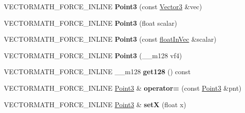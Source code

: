 \begin{DoxyCompactItemize}
\item 
\mbox{\label{classVectormath_1_1Aos_1_1Point3_a7ede6b811d45cdbe2cc50a5c2c4d5615}} 
V\+E\+C\+T\+O\+R\+M\+A\+T\+H\+\_\+\+F\+O\+R\+C\+E\+\_\+\+I\+N\+L\+I\+NE {\bfseries Point3} (const \hyperlink{classVectormath_1_1Aos_1_1Vector3}{Vector3} \&vec)
\item 
\mbox{\label{classVectormath_1_1Aos_1_1Point3_a438b318e3c3209422e75f6305873c349}} 
V\+E\+C\+T\+O\+R\+M\+A\+T\+H\+\_\+\+F\+O\+R\+C\+E\+\_\+\+I\+N\+L\+I\+NE {\bfseries Point3} (float scalar)
\item 
\mbox{\label{classVectormath_1_1Aos_1_1Point3_a76ef26043aae56eae15ec260f7862d37}} 
V\+E\+C\+T\+O\+R\+M\+A\+T\+H\+\_\+\+F\+O\+R\+C\+E\+\_\+\+I\+N\+L\+I\+NE {\bfseries Point3} (const \hyperlink{classVectormath_1_1floatInVec}{float\+In\+Vec} \&scalar)
\item 
\mbox{\label{classVectormath_1_1Aos_1_1Point3_a988043c1c34940ef33ff2bb59afaed4c}} 
V\+E\+C\+T\+O\+R\+M\+A\+T\+H\+\_\+\+F\+O\+R\+C\+E\+\_\+\+I\+N\+L\+I\+NE {\bfseries Point3} (\+\_\+\+\_\+m128 vf4)
\item 
\mbox{\label{classVectormath_1_1Aos_1_1Point3_add25ef6b30238421fc8ef3b9d4aa3325}} 
V\+E\+C\+T\+O\+R\+M\+A\+T\+H\+\_\+\+F\+O\+R\+C\+E\+\_\+\+I\+N\+L\+I\+NE \+\_\+\+\_\+m128 {\bfseries get128} () const
\item 
\mbox{\label{classVectormath_1_1Aos_1_1Point3_ac73c3adfeb7fcc847e6d1a2afde4b85b}} 
V\+E\+C\+T\+O\+R\+M\+A\+T\+H\+\_\+\+F\+O\+R\+C\+E\+\_\+\+I\+N\+L\+I\+NE \hyperlink{classVectormath_1_1Aos_1_1Point3}{Point3} \& {\bfseries operator=} (const \hyperlink{classVectormath_1_1Aos_1_1Point3}{Point3} \&pnt)
\item 
\mbox{\label{classVectormath_1_1Aos_1_1Point3_a698bc3129afa7654fcb60cf3616908d5}} 
V\+E\+C\+T\+O\+R\+M\+A\+T\+H\+\_\+\+F\+O\+R\+C\+E\+\_\+\+I\+N\+L\+I\+NE \hyperlink{classVectormath_1_1Aos_1_1Point3}{Point3} \& {\bfseries setX} (float x)
\item 
\mbox{\label{classVectormath_1_1Aos_1_1Point3_a355035b13db8ff3fdd8610a58ae94227}} 

\end{DoxyCompactItemize}
